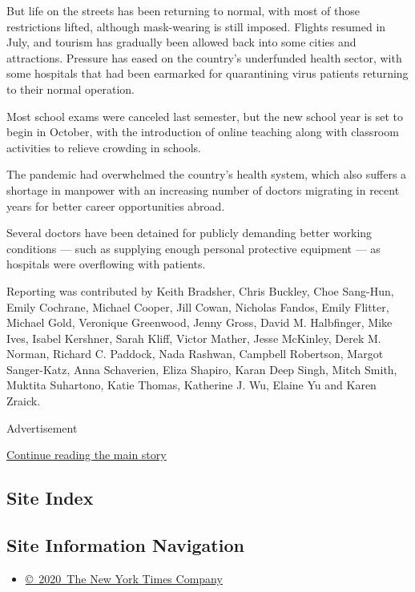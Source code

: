 But life on the streets has been returning to normal, with most of those
restrictions lifted, although mask-wearing is still imposed. Flights
resumed in July, and tourism has gradually been allowed back into some
cities and attractions. Pressure has eased on the country's underfunded
health sector, with some hospitals that had been earmarked for
quarantining virus patients returning to their normal operation.

Most school exams were canceled last semester, but the new school year
is set to begin in October, with the introduction of online teaching
along with classroom activities to relieve crowding in schools.

The pandemic had overwhelmed the country's health system, which also
suffers a shortage in manpower with an increasing number of doctors
migrating in recent years for better career opportunities abroad.

Several doctors have been detained for publicly demanding better working
conditions --- such as supplying enough personal protective equipment
--- as hospitals were overflowing with patients.

Reporting was contributed by Keith Bradsher, Chris Buckley, Choe
Sang-Hun, Emily Cochrane, Michael Cooper, Jill Cowan, Nicholas Fandos,
Emily Flitter, Michael Gold, Veronique Greenwood, Jenny Gross, David M.
Halbfinger, Mike Ives, Isabel Kershner, Sarah Kliff, Victor Mather,
Jesse McKinley, Derek M. Norman, Richard C. Paddock, Nada Rashwan,
Campbell Robertson, Margot Sanger-Katz, Anna Schaverien, Eliza Shapiro,
Karan Deep Singh, Mitch Smith, Muktita Suhartono, Katie Thomas,
Katherine J. Wu, Elaine Yu and Karen Zraick.

Advertisement

\protect\hyperlink{after-bottom}{Continue reading the main story}

\hypertarget{site-index}{%
\subsection{Site Index}\label{site-index}}

\hypertarget{site-information-navigation}{%
\subsection{Site Information
Navigation}\label{site-information-navigation}}

\begin{itemize}
\tightlist
\item
  \href{https://help.nytimes3xbfgragh.onion/hc/en-us/articles/115014792127-Copyright-notice}{©~2020~The
  New York Times Company}
\end{itemize}

